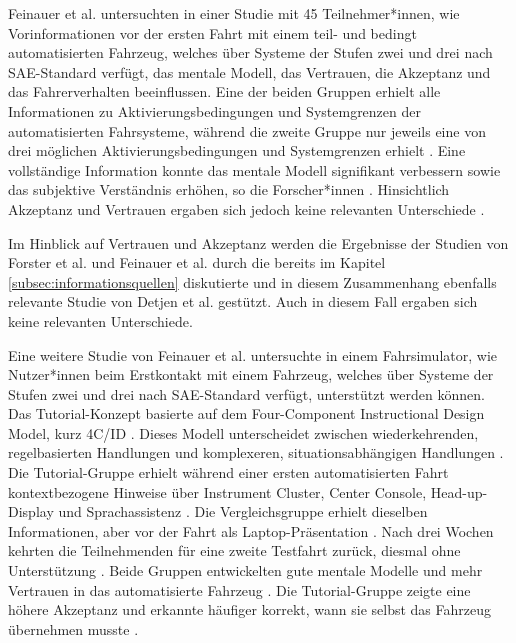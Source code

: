Feinauer et al. \cite{feinauer2025impact} untersuchten in einer Studie mit 45 Teilnehmer*innen, wie Vorinformationen vor der ersten Fahrt mit einem teil- und bedingt automatisierten Fahrzeug, welches über Systeme der Stufen zwei und drei nach SAE-Standard \cite{SAE2021J3016} verfügt, das mentale Modell, das Vertrauen, die Akzeptanz und das Fahrerverhalten beeinflussen. Eine der beiden Gruppen erhielt alle Informationen zu Aktivierungsbedingungen und Systemgrenzen der automatisierten Fahrsysteme, während die zweite Gruppe nur jeweils eine von drei möglichen Aktivierungsbedingungen und Systemgrenzen erhielt \cite{feinauer2025impact}. Eine vollständige Information konnte das mentale Modell signifikant verbessern sowie das subjektive Verständnis erhöhen, so die Forscher*innen \cite{feinauer2025impact}. Hinsichtlich Akzeptanz und Vertrauen ergaben sich jedoch keine relevanten Unterschiede \cite{feinauer2025impact}.

Im Hinblick auf Vertrauen und Akzeptanz werden die Ergebnisse der Studien von Forster et al. \cite{forster2020and} und Feinauer et al. \cite{feinauer2025impact} durch die bereits im Kapitel \ref{subsec:informationsquellen} diskutierte und in diesem Zusammenhang ebenfalls relevante Studie von Detjen et al. \cite{detjen2021supporting} gestützt. Auch in diesem Fall ergaben sich keine relevanten Unterschiede.

Eine weitere Studie von Feinauer et al. \cite{feinauer2023first} untersuchte in einem Fahrsimulator, wie Nutzer*innen beim Erstkontakt mit einem Fahrzeug, welches über Systeme der Stufen zwei und drei nach SAE-Standard \cite{SAE2021J3016} verfügt, unterstützt werden können. Das Tutorial-Konzept basierte auf dem Four-Component Instructional Design Model, kurz 4C/ID \cite{feinauer2023first}. Dieses Modell unterscheidet zwischen wiederkehrenden, regelbasierten Handlungen und komplexeren, situationsabhängigen Handlungen \cite{feinauer2023first}. Die Tutorial-Gruppe erhielt während einer ersten automatisierten Fahrt kontextbezogene Hinweise über Instrument Cluster, Center Console, Head-up-Display und Sprachassistenz \cite{feinauer2023first}. Die Vergleichsgruppe erhielt dieselben Informationen, aber vor der Fahrt als Laptop-Präsentation \cite{feinauer2023first}. Nach drei Wochen kehrten die Teilnehmenden für eine zweite Testfahrt zurück, diesmal ohne Unterstützung \cite{feinauer2023first}. Beide Gruppen entwickelten gute mentale Modelle und mehr Vertrauen in das automatisierte Fahrzeug \cite{feinauer2023first}. Die Tutorial-Gruppe zeigte eine höhere Akzeptanz und erkannte häufiger korrekt, wann sie selbst das Fahrzeug übernehmen musste \cite{feinauer2023first}.

